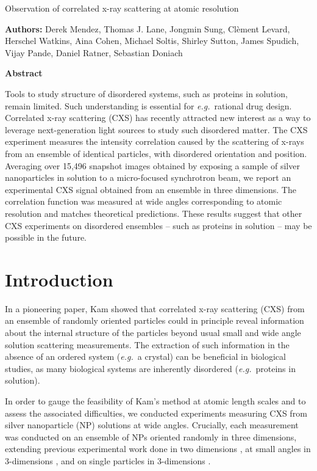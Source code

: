 \documentclass [11pt,fleqn]{article}
\def \hfb {\hfill\break}
\begin{document}
 
\hspace{1cm}{\bf Title:} Observation of correlated x-ray scattering at atomic resolution \hfb
 
{\bf Authors:} Derek Mendez, Thomas J. Lane, Jongmin Sung,  Cl\`ement Levard, Herschel Watkins, Aina Cohen, Michael Soltis, Shirley Sutton, James Spudich, Vijay Pande,  Daniel Ratner, Sebastian Doniach

{\bf Abstract}

Tools to study structure of disordered systems, such as proteins in solution, remain limited. Such understanding is essential for \emph{e.g.}~rational drug design. Correlated x-ray scattering (CXS) has recently attracted new interest as a way to leverage next-generation light sources to study such disordered matter. The CXS experiment measures the intensity correlation caused by the scattering of x-rays from an ensemble of identical particles, with disordered orientation and position. Averaging over 15,496 snapshot images obtained by exposing a sample of silver nanoparticles in solution to a micro-focused synchrotron beam, we report an experimental CXS signal obtained from an ensemble in three dimensions. The correlation function was measured at  wide angles corresponding to atomic resolution and matches theoretical predictions. These results suggest that other CXS experiments on disordered ensembles -- such as proteins in solution -- may be possible in the future.


\section{Introduction}

In a pioneering paper, Kam \cite{Kam:1977wc} showed that correlated x-ray scattering (CXS) from an ensemble of randomly oriented particles could in principle reveal information about the internal structure of the particles beyond usual small and wide angle solution scattering measurements. The extraction of such information in the absence of an ordered system (\textit{e.g.}~a crystal) can be beneficial in biological studies, as many biological systems are inherently disordered (\textit{e.g.}~proteins in solution).

In order to gauge the feasibility of Kam's method at atomic length scales and to assess the associated difficulties, we conducted experiments measuring CXS from silver nanoparticle (NP) solutions at wide angles. Crucially, each measurement was conducted on an ensemble of NPs oriented randomly in three dimensions, extending previous experimental work done in two dimensions \cite{Saldin:2011ch}, at small angles in 3-dimensions \cite{Kam:1981ua, Wochner:2009ia}, and on single particles in 3-dimensions \cite{Kam:1985tz, Starodub:1fy}. 
\end{document}

